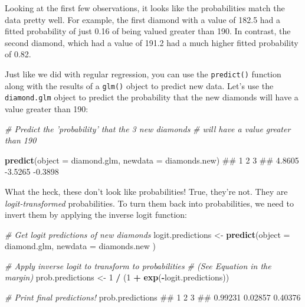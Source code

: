 \documentclass[]{book}
\newenvironment{Shaded}{\begin{snugshade}}{\end{snugshade}}
\newcommand{\KeywordTok}[1]{\textcolor[rgb]{0.13,0.29,0.53}{\textbf{#1}}}
\newcommand{\DataTypeTok}[1]{\textcolor[rgb]{0.13,0.29,0.53}{#1}}
\newcommand{\DecValTok}[1]{\textcolor[rgb]{0.00,0.00,0.81}{#1}}
\newcommand{\StringTok}[1]{\textcolor[rgb]{0.31,0.60,0.02}{#1}}
\newcommand{\CommentTok}[1]{\textcolor[rgb]{0.56,0.35,0.01}{\textit{#1}}}
\newcommand{\OperatorTok}[1]{\textcolor[rgb]{0.81,0.36,0.00}{\textbf{#1}}}
\newcommand{\NormalTok}[1]{#1}
\theoremstyle{definition}
\theoremstyle{definition}
\theoremstyle{remark}
\begin{document}
Looking at the first few observations, it looks like the probabilities
match the data pretty well. For example, the first diamond with a value
of 182.5 had a fitted probability of just 0.16 of being valued greater
than 190. In contrast, the second diamond, which had a value of 191.2
had a much higher fitted probability of 0.82.

Just like we did with regular regression, you can use the
\texttt{predict()} function along with the results of a \texttt{glm()}
object to predict new data. Let's use the \texttt{diamond.glm} object to
predict the probability that the new diamonds will have a value greater
than 190:

\begin{Shaded}
\begin{Highlighting}[]
\CommentTok{# Predict the 'probability' that the 3 new diamonds }
\CommentTok{#  will have a value greater than 190}

\KeywordTok{predict}\NormalTok{(}\DataTypeTok{object =}\NormalTok{ diamond.glm,}
        \DataTypeTok{newdata =}\NormalTok{ diamonds.new)}
\NormalTok{##       1       2       3 }
\NormalTok{##  4.8605 -3.5265 -0.3898}
\end{Highlighting}
\end{Shaded}

What the heck, these don't look like probabilities! True, they're not.
They are \emph{logit-transformed} probabilities. To turn them back into
probabilities, we need to invert them by applying the inverse logit
function:

\begin{Shaded}
\begin{Highlighting}[]
\CommentTok{# Get logit predictions of new diamonds}
\NormalTok{logit.predictions <-}\StringTok{ }\KeywordTok{predict}\NormalTok{(}\DataTypeTok{object =}\NormalTok{ diamond.glm,}
                             \DataTypeTok{newdata =}\NormalTok{ diamonds.new}
\NormalTok{                             )}

\CommentTok{# Apply inverse logit to transform to probabilities}
\CommentTok{#  (See Equation in the margin)}
\NormalTok{prob.predictions <-}\StringTok{ }\DecValTok{1} \OperatorTok{/}\StringTok{ }\NormalTok{(}\DecValTok{1} \OperatorTok{+}\StringTok{ }\KeywordTok{exp}\NormalTok{(}\OperatorTok{-}\NormalTok{logit.predictions))}

\CommentTok{# Print final predictions!}
\NormalTok{prob.predictions}
\NormalTok{##       1       2       3 }
\NormalTok{## 0.99231 0.02857 0.40376}
\end{Highlighting}
\end{Shaded}
\end{document}
